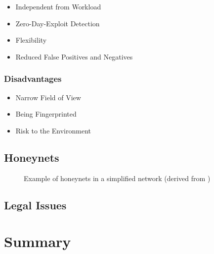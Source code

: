 \begin{itemize}
    \item Independent from Workload
    \item Zero-Day-Exploit Detection
    \item Flexibility
    \item Reduced False Positives and Negatives
\end{itemize}

\subsubsection{Disadvantages}

\begin{itemize}
    \item Narrow Field of View
    \item Being Fingerprinted
    \item Risk to the Environment
\end{itemize}

\subsection{Honeynets}

\begin{figure}[h]
    \centering
    
    \caption{Example of honeynets in a simplified network (derived from \cite{Spitzner2003})}
    \label{fig:honeynet-example}
\end{figure}

\cite{Spitzner2003}

\subsection{Legal Issues}

\cite{Spitzner2003}

\section{Summary}

